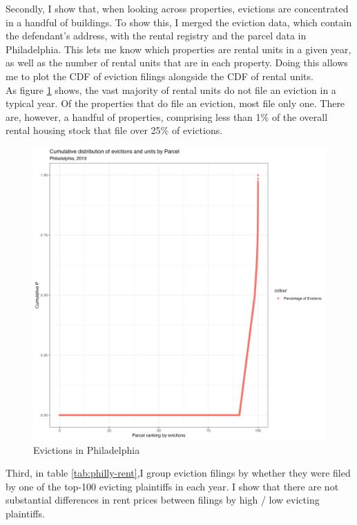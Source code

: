 \documentclass{article}
\begin{document}
Secondly, I show that, when looking across properties, evictions are concentrated in a handful of buildings. To show this, I merged the eviction data, which contain the defendant's address, with the rental registry and the parcel data in Philadelphia. This lets me know which properties are rental units in a given year, as well as the number of rental units that are in each property. Doing this allows me to plot the CDF of eviction filings alongside the CDF of rental units. \\

As figure \ref{fig:philly-evict-parcel} shows, the vast majority of rental units do not file an eviction in a typical year. Of the properties that do file an eviction, most file only one. There are, however, a handful of properties, comprising less than 1\% of the overall rental housing stock that file over 25\% of evictions. \\

\begin{figure}[htbp]
    \centering
    \includegraphics[width=1\linewidth]{figs/cumulative_evict_dist_parcels.png}
    \caption{Evictions in Philadelphia}
    \label{fig:philly-evict-parcel}
\end{figure}

Third, in table \ref{tab:philly-rent},I group eviction filings by whether they were filed by one of the top-100 evicting plaintiffs in each year. I show that there are not substantial differences in rent prices between filings by high / low evicting plaintiffs.\\
\end{document}
